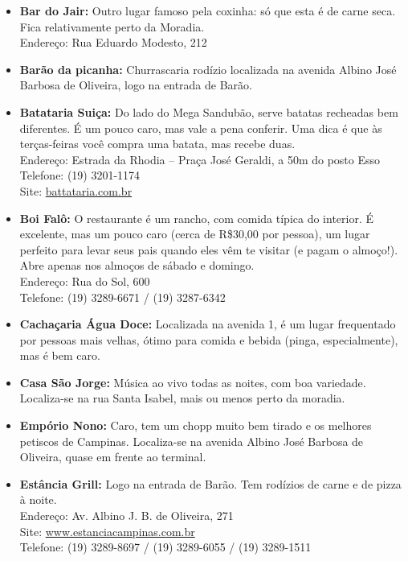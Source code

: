 \begin{itemize}
    \item   \textbf{Bar do Jair:} Outro lugar famoso pela coxinha: só que esta é
        de carne seca. Fica relativamente perto da Moradia.
        \\Endereço: Rua Eduardo Modesto, 212

    \item   \textbf{Barão da picanha:} Churrascaria rodízio localizada na
        avenida Albino José Barbosa de Oliveira, logo na entrada de Barão.

    \item   \textbf{Batataria Suiça:} Do lado do Mega Sandubão, serve batatas
        recheadas bem diferentes. É um pouco caro, mas vale a pena conferir. Uma
        dica é que às terças-feiras você compra uma batata, mas recebe duas.
        \\Endereço: Estrada da Rhodia -- Praça José Geraldi, a 50m do posto Esso
        \\Telefone: (19) 3201-1174
        \\Site: \url{battataria.com.br}

    \item   \textbf{Boi Falô:} O restaurante é um rancho, com comida típica do
        interior. É excelente, mas um pouco caro (cerca de R\$30,00 por pessoa),
        um lugar perfeito para levar seus pais quando eles vêm te visitar (e
        pagam o almoço!). Abre apenas nos almoços de sábado e domingo.
        \\Endereço: Rua do Sol, 600
        \\Telefone: (19) 3289-6671 / (19) 3287-6342%

    \item   \textbf{Cachaçaria Água Doce:} Localizada na avenida 1, é um lugar
        frequentado por pessoas mais velhas, ótimo para comida e bebida (pinga,
        especialmente), mas é bem caro.

    \item   \textbf{Casa São Jorge:} Música ao vivo todas as noites, com boa
        variedade. Localiza-se na rua Santa Isabel, mais ou menos perto da
        moradia.

    \item   \textbf{Empório Nono:} Caro, tem um chopp muito bem tirado e os
        melhores petiscos de Campinas. Localiza-se na avenida Albino José
        Barbosa de Oliveira, quase em frente ao terminal.

    \item   \textbf{Estância Grill:} Logo na entrada de Barão. Tem rodízios de
        carne e de pizza à noite.
        \\Endereço: Av. Albino J. B. de Oliveira, 271
        \\Site: \url{www.estanciacampinas.com.br}
        \\Telefone: (19) 3289-8697 / (19) 3289-6055 / (19) 3289-1511


\end{itemize}
